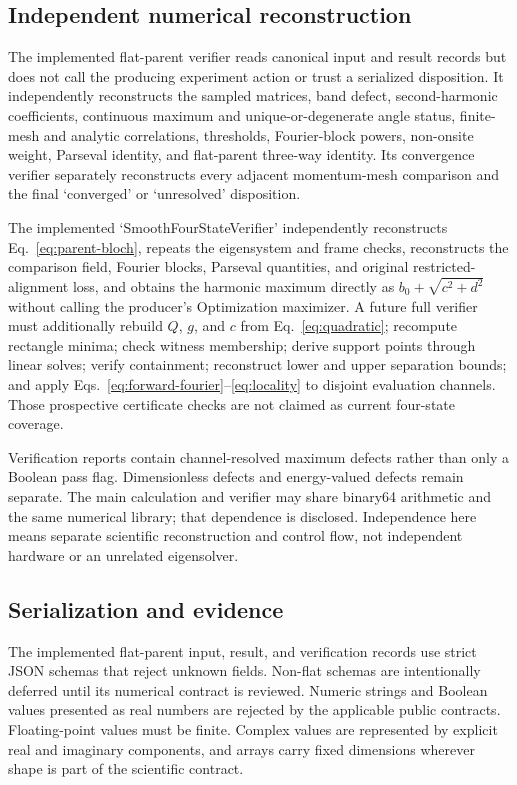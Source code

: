 \documentclass[11pt]{article}
\begin{document}
\subsection{Independent numerical reconstruction}

The implemented flat-parent verifier reads canonical input and result records but does
not call the producing experiment action or trust a serialized disposition. It
independently reconstructs the sampled matrices, band defect, second-harmonic
coefficients, continuous maximum and unique-or-degenerate angle status, finite-mesh and
analytic correlations, thresholds, Fourier-block powers, non-onsite weight, Parseval
identity, and flat-parent three-way identity. Its convergence verifier separately
reconstructs every adjacent momentum-mesh comparison and the final `converged' or
`unresolved' disposition.

The implemented `SmoothFourStateVerifier' independently reconstructs
Eq.~\eqref{eq:parent-bloch}, repeats the eigensystem and frame checks, reconstructs the
comparison field, Fourier blocks, Parseval quantities, and original restricted-alignment
loss, and obtains the harmonic maximum directly as
$b_0+\sqrt{c^2+d^2}$ without calling the producer's Optimization maximizer. A future
full verifier must additionally rebuild $Q$, $g$, and $c$ from
Eq.~\eqref{eq:quadratic}; recompute rectangle minima; check witness membership; derive
support points through linear solves; verify containment; reconstruct lower and upper
separation bounds; and apply
Eqs.~\eqref{eq:forward-fourier}--\eqref{eq:locality} to disjoint evaluation channels.
Those prospective certificate checks are not claimed as current four-state coverage.

Verification reports contain channel-resolved maximum defects rather than only a Boolean
pass flag. Dimensionless defects and energy-valued defects remain separate. The main
calculation and verifier may share binary64 arithmetic and the same numerical library;
that dependence is disclosed. Independence here means separate scientific
reconstruction and control flow, not independent hardware or an unrelated eigensolver.

\subsection{Serialization and evidence}

The implemented flat-parent input, result, and verification records use strict JSON
schemas that reject unknown fields. Non-flat schemas are intentionally deferred until
its numerical contract is reviewed. Numeric strings and Boolean values presented as real
numbers are rejected by the applicable public contracts.
Floating-point values must be finite. Complex values are represented by explicit real
and imaginary components, and arrays carry fixed dimensions wherever shape is part of
the scientific contract.
\end{document}
